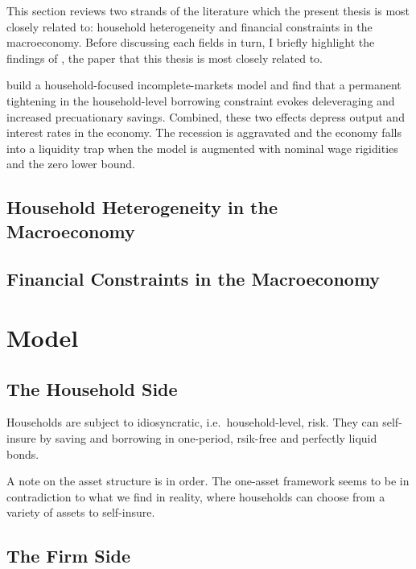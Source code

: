 \documentclass[12pt]{article}
\numberwithin{equation}{section} %
\begin{document}
This section reviews two strands of the literature which the present thesis is most closely related to: household heterogeneity and financial constraints in the macroeconomy. Before discussing each fields in turn, I briefly highlight the findings of \textcite{gl2017}, the paper that this thesis is most closely related to. 

\textcite{gl2017} build a household-focused incomplete-markets model and find that a permanent tightening in the household-level borrowing constraint evokes deleveraging and increased precuationary savings. Combined, these two effects depress output and interest rates in the economy. The recession is aggravated and the economy falls into a liquidity trap when the model is augmented with nominal wage rigidities and the zero lower bound. 

\subsection{Household Heterogeneity in the Macroeconomy}
\label{sec:literature-hetero}

\subsection{Financial Constraints in the Macroeconomy}
\label{sec:literature-finance}

\section{Model}
\label{sec:model}

\subsection{The Household Side}
\label{sec:model-hh}

Households are subject to idiosyncratic, i.e.~household-level, risk. They can self-insure by saving and borrowing in one-period, rsik-free and perfectly liquid bonds.

A note on the asset structure is in order. The one-asset framework seems to be in contradiction to what we find in reality, where households can choose from a variety of assets to self-insure. 

\subsection{The Firm Side}
\label{sec:model-firms}
\end{document}
